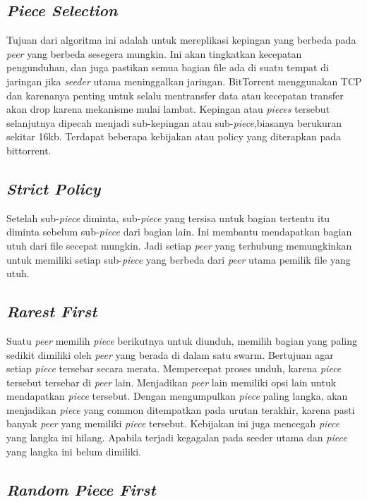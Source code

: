 \subsection{\emph{Piece Selection}}

Tujuan dari algoritma ini adalah untuk mereplikasi kepingan yang berbeda pada \emph{peer} yang berbeda sesegera mungkin. Ini akan tingkatkan kecepatan pengunduhan, dan juga pastikan semua bagian file ada di suatu tempat di jaringan jika \emph{seeder} utama meninggalkan jaringan. BitTorrent menggunakan TCP dan karenanya penting untuk selalu mentransfer data atau kecepatan transfer akan drop karena mekanisme mulai lambat. Kepingan atau \emph{pieces} tersebut selanjutnya dipecah menjadi sub-kepingan atau sub-\emph{piece},biasanya berukuran sekitar 16kb. Terdapat beberapa kebijakan atau policy yang diterapkan pada bittorrent.

\subsection{\emph{Strict Policy}}

Setelah sub-\emph{piece} diminta, sub-\emph{piece} yang tersisa untuk bagian tertentu itu diminta sebelum sub-\emph{piece} dari bagian lain. Ini membantu mendapatkan bagian utuh dari file secepat mungkin. Jadi setiap \emph{peer} yang terhubung memungkinkan untuk memiliki setiap sub-\emph{piece} yang berbeda dari \emph{peer} utama pemilik file yang utuh.

\subsection{\emph{Rarest First}}

Suatu \emph{peer} memilih \emph{piece} berikutnya untuk diunduh, memilih bagian yang paling sedikit dimiliki oleh \emph{peer} yang berada di dalam satu swarm. Bertujuan agar setiap \emph{piece} tersebar secara merata. Mempercepat proses unduh, karena \emph{piece} tersebut tersebar di \emph{peer} lain. Menjadikan \emph{peer} lain memiliki opsi lain untuk mendapatkan \emph{piece} tersebut. Dengan mengumpulkan \emph{piece} paling langka, akan menjadikan \emph{piece} yang common ditempatkan pada urutan terakhir, karena pasti banyak \emph{peer} yang memiliki \emph{piece} tersebut. Kebijakan ini juga mencegah \emph{piece} yang langka ini hilang. Apabila terjadi kegagalan pada seeder utama dan \emph{piece} yang langka ini belum dimiliki.

\subsection{\emph{Random \emph{Piece} First}}

